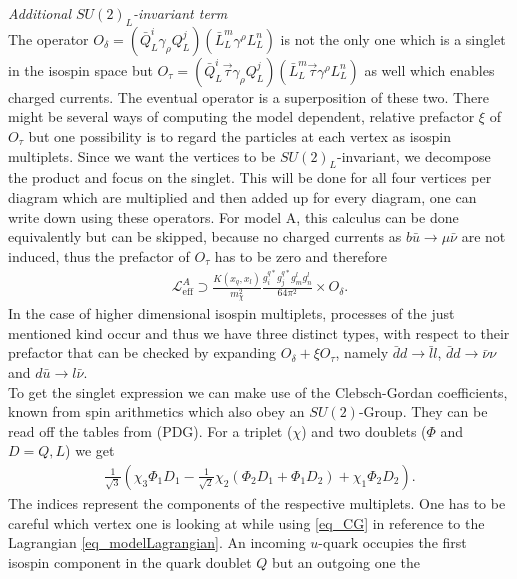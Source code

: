  \noindent \textit{Additional $SU(2)_L$-invariant term}\\
\noindent The operator $O_\delta=\left(\bar Q_L^i \gamma_\rho Q_L^j\right)\left(\bar L_L^m \gamma^\rho L_L^n\right)$ is not the only one which is a singlet
in the isospin space but $O_\tau=\left(\bar Q_L^i\vec \tau \gamma_\rho Q_L^j\right)\left(\bar L_L^m\vec \tau \gamma^\rho L_L^n\right)$ as well which enables
charged currents. The eventual operator is a superposition of these two. There might be several ways of computing the model dependent, relative 
prefactor $\xi$ of $O_\tau$  but one possibility is to regard the particles at each vertex as isospin multiplets. Since we want the vertices to be 
$SU(2)_L$-invariant, we 
decompose the product and focus on the singlet. This will be done for all four vertices per diagram which are multiplied and then added up for every diagram,
one can write down using these operators. For model A, this calculus can be done equivalently but can be skipped, because no charged currents as 
$b \bar u \rightarrow \mu \bar \nu$ are not induced, thus the prefactor of $O_\tau$ has to be zero and therefore 
\begin{align}
  \mathcal{L}^A_\text{eff} \supset \frac{K(x_q,x_l)}{m_\chi^2}\frac{g_i^{q*} g_j^{q*} g_m^l g_n^l}{64\pi^2} \times O_\delta.
 \label{eq_LagBSmumuModA}
\end{align}
In the case of higher dimensional isospin multiplets, processes of the just mentioned kind occur and thus we have three distinct types, with respect to 
their prefactor that can be checked by expanding $O_\delta + \xi O_\tau$, namely $\bar d d\rightarrow \bar l l$, $\bar d d \rightarrow \bar\nu \nu$ and 
$d \bar u\rightarrow l\bar\nu$. \\
\noindent To get the singlet expression we can make use of the Clebsch-Gordan coefficients, known from spin arithmetics which also obey an $SU(2)$-Group.
They can be read off the tables from (PDG). For a triplet ($\chi$) and two doublets ($\Phi$ and $D=Q,L$) we get
\begin{align}
 \frac{1}{\sqrt{3}}\left(\chi_3\Phi_1D_1 - \frac{1}{\sqrt{2}}\chi_2\left(\Phi_2D_1+\Phi_1 D_2\right) + \chi_1\Phi_2D_2 \right).
 \label{eq_CG}
\end{align}
The indices represent the components of the respective multiplets. One has to be careful which vertex one is looking at while using \eqref{eq_CG} in reference
to the Lagrangian \eqref{eq_modelLagrangian}. An incoming $u$-quark occupies the first isospin component in the quark doublet $Q$ but an outgoing one the 
